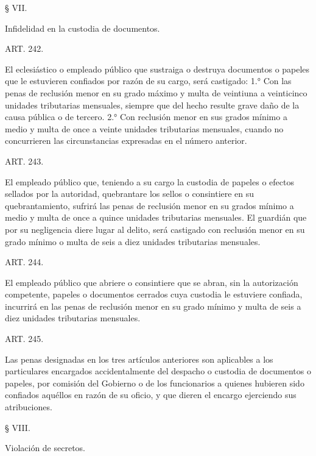     § VII.

    Infidelidad en la custodia de documentos.


    ART. 242.

    El eclesiástico o empleado público que sustraiga o destruya documentos o papeles que le estuvieren confiados por razón de su cargo, será castigado:
    1.° Con las penas de reclusión menor en su grado máximo y multa de veintiuna a veinticinco unidades tributarias mensuales, siempre que del hecho resulte grave daño de la causa pública o de tercero.
    2.° Con reclusión menor en sus grados mínimo a medio y multa de once a veinte unidades tributarias mensuales, cuando no concurrieren las circunstancias expresadas en el número anterior.





    ART. 243.

    El empleado público que, teniendo a su cargo la custodia de papeles o efectos sellados por la autoridad, quebrantare los sellos o consintiere en su quebrantamiento, sufrirá las penas de reclusión menor en su grados mínimo a medio y multa de once a quince unidades tributarias mensuales.
    El guardián que por su negligencia diere lugar al delito, será castigado con reclusión menor en su grado mínimo o multa de seis a diez unidades tributarias mensuales.





    ART. 244.

    El empleado público que abriere o consintiere que se abran, sin la autorización competente, papeles o documentos cerrados cuya custodia le estuviere confiada, incurrirá en las penas de reclusión menor en su grado mínimo y multa de seis a diez unidades tributarias mensuales.








    ART. 245.

    Las penas designadas en los tres artículos anteriores son aplicables a los particulares encargados accidentalmente del despacho o custodia de documentos o papeles, por comisión del Gobierno o de los funcionarios a quienes hubieren sido confiados aquéllos en razón de su oficio, y que dieren el encargo ejerciendo sus atribuciones.


    § VIII.

    Violación de secretos.





